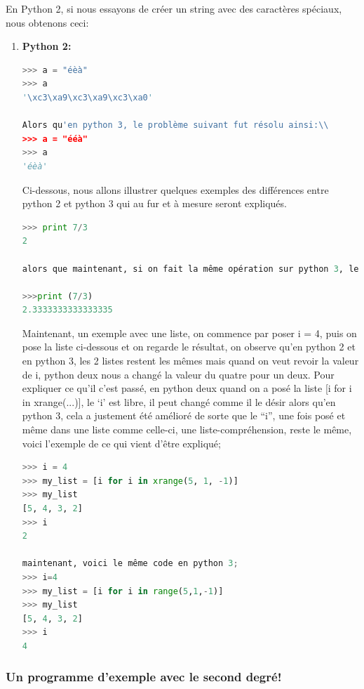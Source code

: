 \documentclass[a4paper, 12pt]{article}
\numberwithin{equation}{subsection}
\begin{document}
En Python 2, si nous essayons de créer un string avec des caractères spéciaux, nous obtenons ceci:\\
\begin{enumerate}
  \item \textbf{Python 2:}
\begin{lstlisting}[language=Python]
>>> a = "éèà"
>>> a
'\xc3\xa9\xc3\xa9\xc3\xa0'

Alors qu'en python 3, le problème suivant fut résolu ainsi:\\
>>> a = "ééà"
>>> a
'éèà'
\end{lstlisting}

Ci-dessous, nous allons illustrer quelques exemples des différences entre python 2 et python 3 qui au fur et à mesure seront expliqués. \\

\begin{lstlisting}[language=Python]
>>> print 7/3
2

alors que maintenant, si on fait la même opération sur python 3, le résultat obtenu y est beaucoup plus précis, voici la même division sur python 3;\\

>>>print (7/3)
2.3333333333333335
\end{lstlisting}

Maintenant, un exemple avec une liste, on commence par poser i = 4, puis on pose la liste ci-dessous et on regarde le résultat, on observe qu’en python 2 et en python 3, les 2 listes restent les mêmes mais quand on veut revoir la valeur de i, python deux nous a changé la valeur du quatre pour un deux. Pour expliquer ce qu’il c’est passé, en python deux quand on a posé la liste [i for i in xrange(...)], le ‘i’ est libre, il peut changé comme il le désir alors qu’en python 3, cela a justement été amélioré de sorte que le “i”, une fois posé et même dans une liste comme celle-ci, une liste-compréhension, reste le même, voici l'exemple de ce qui vient d’être expliqué;\\
\begin{lstlisting}[language=Python]
>>> i = 4 
>>> my_list = [i for i in xrange(5, 1, -1)] 
>>> my_list
[5, 4, 3, 2]
>>> i
2

maintenant, voici le même code en python 3;
>>> i=4
>>> my_list = [i for i in range(5,1,-1)]
>>> my_list
[5, 4, 3, 2]
>>> i
4

\end{lstlisting}
\end{enumerate}
\subsubsection{Un programme d'exemple avec le second degré!}

\newpage
\end{document}
